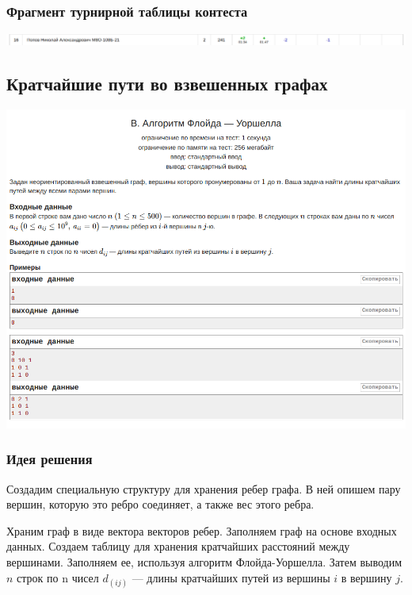 \subsubsection*{Фрагмент турнирной таблицы контеста}
\begin{center}
\includegraphics[width=\textwidth]{standings/Contest7.png}\newline\noindent
\end{center}


\subsection*{Кратчайшие пути во взвешенных графах}

\begin{center}
\includegraphics[width=\textwidth]{statements/Contets8B.png}
\end{center}

\subsubsection*{Идея решения}

Создадим специальную структуру для хранения ребер графа. В ней 
опишем пару вершин, которую это ребро соединяет, а также вес
этого ребра.

Храним граф в виде вектора векторов ребер. Заполняем граф на основе входных данных. Создаем таблицу для хранения кратчайших 
расстояний между вершинами. Заполняем ее, используя алгоритм
Флойда-Уоршелла. Затем выводим $n$ строк по n чисел $d_(ij)$ — длины кратчайших путей из вершины $i$ в вершину $j$.

